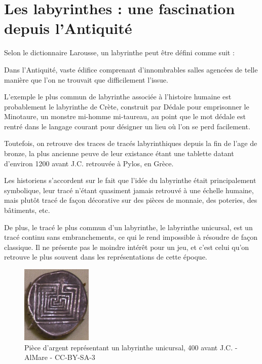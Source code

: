 \documentclass[12pt]{scrreprt} %
\begin{document}
\section{Les labyrinthes : une fascination depuis l'Antiquité}

Selon le dictionnaire Larousse, un labyrinthe peut être défini comme suit :

Dans l'Antiquité, vaste édifice comprenant d'innombrables salles agencées de telle manière que l'on ne trouvait que difficilement l'issue. \cite{LabyrintheLarousse}

L'exemple le plus commun de labyrinthe associée à l'histoire humaine est probablement le labyrinthe de Crète, construit par Dédale pour emprisonner le Minotaure, un monstre mi-homme mi-taureau, au point que le mot dédale est rentré dans le langage courant pour désigner un lieu où l'on se perd facilement.

Toutefois, on retrouve des traces de tracés labyrinthiques depuis la fin de l'age de bronze, la plus ancienne peuve de leur existance étant une tablette datant d'environ 1200 avant J.C. retrouvée à Pylos, en Grèce.\cite{Kern2000}

Les historiens s'accordent sur le fait que l'idée du labyrinthe était principalement symbolique, leur tracé n'étant quasiment jamais retrouvé à une échelle humaine, mais plutôt tracé de façon décorative sur des pièces de monnaie, des poteries, des bâtiments, etc.

De plus, le tracé le plus commun d'un labyrinthe, le labyrinthe unicursal, est un tracé continu sans embranchements, ce qui le rend impossible à résoudre de façon classique. Il ne présente pas le moindre intérêt pour un jeu, et c'est celui qu'on retrouve le plus souvent dans les représentations de cette époque.

\begin{figure}[h]
    \centering
    \includegraphics[width=0.3\textwidth]{images/pieceknossos.jpeg}
    \caption{Pièce d'argent représentant un labyrinthe unicursal, 400 avant J.C. - AlMare - CC-BY-SA-3}
\end{figure}
\end{document}

